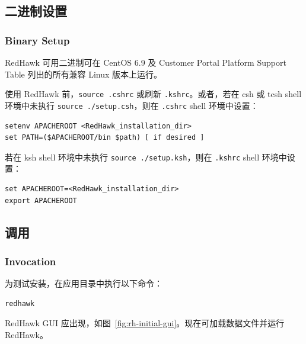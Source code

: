 \subsection{二进制设置}
\subsubsection*{Binary Setup}

RedHawk 可用二进制可在 CentOS 6.9 及 Customer Portal Platform Support Table 列出的所有兼容 Linux 版本上运行。

使用 RedHawk 前，\texttt{source .cshrc} 或刷新 \texttt{.kshrc}。或者，若在 csh 或 tcsh shell 环境中未执行 \texttt{source ./setup.csh}，则在 \texttt{.cshrc} shell 环境中设置：
\begin{lstlisting}
setenv APACHEROOT <RedHawk_installation_dir>
set PATH=($APACHEROOT/bin $path) [ if desired ]
\end{lstlisting}

若在 ksh shell 环境中未执行 \texttt{source ./setup.ksh}，则在 \texttt{.kshrc} shell 环境中设置：
\begin{lstlisting}
set APACHEROOT=<RedHawk_installation_dir>
export APACHEROOT
\end{lstlisting}

\subsection{调用}
\subsubsection*{Invocation}

为测试安装，在应用目录中执行以下命令：
\begin{lstlisting}
redhawk
\end{lstlisting}

RedHawk GUI 应出现，如图~\ref{fig:rh-initial-gui}。现在可加载数据文件并运行 RedHawk。

\label{fig:rh-initial-gui}
